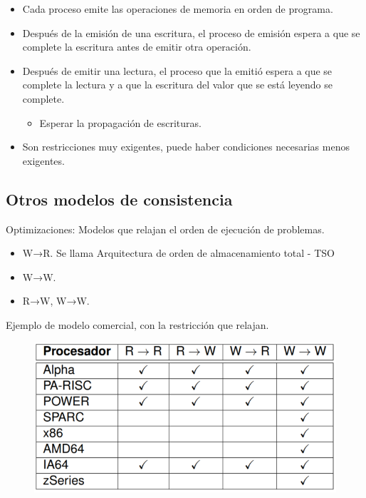 \documentclass[12pt, twoside, openright]{report} %
\begin{document}
    \begin{itemize}
    
    \item
      Cada proceso emite las operaciones de memoria en orden de
      programa.
    \item
      Después de la emisión de una escritura, el proceso de emisión
      espera a que se complete la escritura antes de emitir otra
      operación.
    \item
      Después de emitir una lectura, el proceso que la emitió espera a
      que se complete la lectura y a que la escritura del valor que se
      está leyendo se complete.

      \begin{itemize}
      
      \item
        Esperar la propagación de escrituras.
      \end{itemize}
    \item
      Son restricciones muy exigentes, puede haber condiciones
      necesarias menos exigentes.
    \end{itemize}

\subsection{Otros modelos de consistencia}

 
    Optimizaciones: Modelos que relajan el orden de ejecución de
    problemas.

    \begin{itemize}
    
    \item
      W→R. Se llama Arquitectura de orden de almacenamiento total -
      TSO
    \item
      W→W.
    \item
      R→W, W→W.
    \end{itemize}
\pagebreak
    Ejemplo de modelo comercial, con la restricción que relajan.
    \begin{figure}[H]
      {\includegraphics[scale=.5]{Untitled 60.png}}
    \end{figure}
\end{document}

